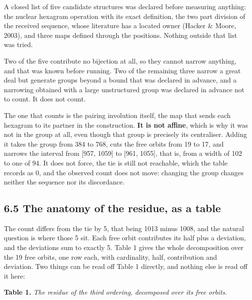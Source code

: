\documentclass[11pt,a4paper]{article}
\begin{document}
A closed list of five candidate structures was declared before measuring anything: the nuclear hexagram operation with its exact definition, the two part division of the received sequence, whose literature has a located owner (Hacker \& Moore, 2003), and three maps defined through the positions. Nothing outside that list was tried.

Two of the five contribute no bijection at all, so they cannot narrow anything, and that was known before running. Two of the remaining three narrow a great deal but generate groups beyond a bound that was declared in advance, and a narrowing obtained with a large unstructured group was declared in advance not to count. It does not count.

The one that counts is the pairing involution itself, the map that sends each hexagram to its partner in the construction. \textbf{It is not affine}, which is why it was not in the group at all, even though that group is precisely its centraliser. Adding it takes the group from 384 to 768, cuts the free orbits from 19 to 17, and narrows the interval from [957, 1059] to [961, 1055], that is, from a width of 102 to one of 94. It does not force, the tie is still not reachable, which the table records as 0, and the observed count does not move: changing the group changes neither the sequence nor its discordance.

\subsection*{6.5 The anatomy of the residue, as a table}

The count differs from the tie by 5, that being 1013 minus 1008, and the natural question is where those 5 sit. Each free orbit contributes its half plus a deviation, and the deviations sum to exactly 5. Table 1 gives the whole decomposition over the 19 free orbits, one row each, with cardinality, half, contribution and deviation. Two things can be read off Table 1 directly, and nothing else is read off it here:

\textbf{Table 1.} \emph{The residue of the third ordering, decomposed over its free orbits.}
\end{document}
